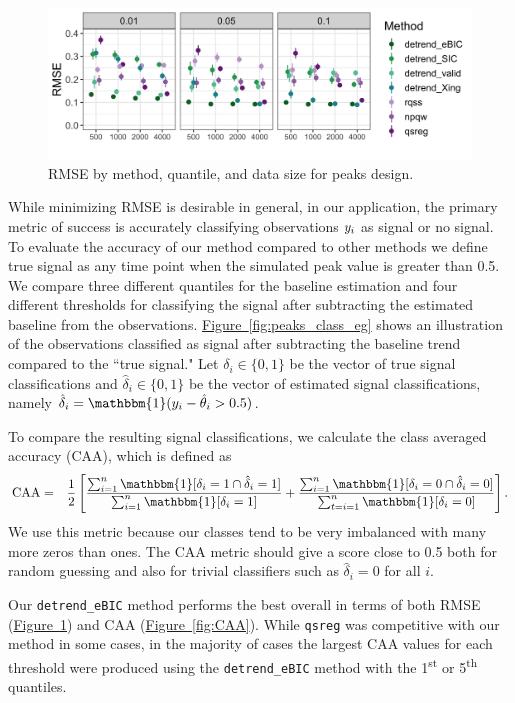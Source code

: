 \documentclass[aoas]{imsart}
\newcommand{\Fig}[1]{\hyperref[fig:#1]{Figure~\ref*{fig:#1}}} %
\newcommand{\Fig}[1]{{Figure~\ref{fig:#1}}} %
\newcommand{\One}{\mathbbm{1}}
\newcommand{\VE}[2]{\MakeLowercase{#1}_{#2}} %
\begin{document}
\begin{figure}
	\includegraphics[width = \linewidth]{Figures/peaks_mse.png}
	\caption{RMSE by method, quantile, and data size for peaks design.}
	\label{fig:peaks_rmse}
\end{figure}

While minimizing RMSE is desirable in general, in our application, the primary metric of success is accurately classifying observations $\VE{y}{i}$ as signal or no signal. To evaluate the accuracy of our method compared to other methods we define true signal as any time point when the simulated peak value is greater than 0.5. We compare three different quantiles for the baseline estimation and four different thresholds for classifying the signal after subtracting the estimated baseline from the observations.  \Fig{peaks_class_eg} shows an illustration of the observations classified as signal after subtracting the baseline trend compared to the ``true signal." Let $\delta_i \in \{0,1\}$ be the vector of true signal classifications and $\hat{\delta}_i \in \{0,1\}$ be the vector of estimated signal classifications, namely $\hat{\delta}_i = \One(\VE{y}{i} - \hat{\theta}_{i} > 0.5)$.


To compare the resulting signal classifications, we calculate the class averaged accuracy (CAA), which is defined as
\begin{eqnarray*}
	\mbox{CAA} & = & \frac{1}{2}\left[\frac{\sum_{i=1}^n \One[\delta_i = 1 \cap \hat{\delta}_i = 1]}{\sum_{i=1}^n \One[\delta_i = 1]} + \frac{\sum_{i=1}^n \One[\delta_i = 0 \cap \hat{\delta}_i=0]}{\sum_{t=i=1}^n \One[\delta_i = 0]}\right].
\end{eqnarray*}
We use this metric because our classes tend to be very imbalanced with many more zeros than ones. The CAA metric should give a score close to 0.5 both for random guessing and also for trivial classifiers such as $\hat{\delta}_i = 0$ for all $i$.

Our \texttt{detrend\_eBIC} method performs the best overall in terms of both RMSE (\Fig{peaks_rmse}) and CAA (\Fig{CAA}). While \texttt{qsreg} was competitive with our method in some cases, in the majority of cases the largest CAA values for each threshold were produced using the \texttt{detrend\_eBIC} method with the 1\textsuperscript{st} or 5\textsuperscript{th} quantiles.
\end{document}
